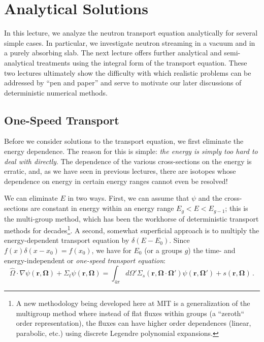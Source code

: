 \chapter{Analytical Solutions}
\label{lec:analytical}

In this lecture, we analyze the neutron transport equation analytically for several simple cases.  In particular, we investigate neutron streaming in a vacuum and in a purely absorbing slab.  The next lecture offers further analytical and semi-analytical treatments using the integral form of the transport equation.  These two lectures ultimately show the difficulty with which realistic problems can be addressed by ``pen and paper'' and serve to motivate our later discussions of deterministic numerical methods.

\section*{One-Speed Transport}

Before we consider solutions to the transport equation, we first eliminate the energy dependence.  The reason for this is simple: \textit{the energy is simply too hard to deal with directly}.  The dependence of the various cross-sections on the energy is erratic, and, as we have seen in previous lectures, there are isotopes whose dependence on energy in certain energy ranges cannot even be resolved!

We can eliminate $E$ in two ways.  First, we can assume that $\psi$ and the cross-sections are constant in energy within an energy range $E_g < E < E_{g-1}$; this is the multi-group method, which has been the workhorse of deterministic transport methods for decades\footnote{A new methodology being developed here at MIT is a generalization of the multigroup method where instead of flat fluxes within groups (a ``zeroth`` order representation), the fluxes can have higher order dependences (linear, parabolic, etc.) using discrete Legendre polynomial expansions.}.  A second, somewhat superficial approach is to multiply the energy-dependent transport equation by $\delta(E-E_0)$.   Since $f(x)\delta(x-x_0) = f(x_0)$, we have for $E_0$ (or a groups $g$) the time- and energy-independent or \textit{one-speed transport equation}:
\begin{equation}
     \hat{\Omega} \cdot \nabla \psi(\mathbf{r},\mathbf{\Omega})  + \Sigma_t \psi(\mathbf{r},\mathbf{\Omega}) =   \int_{4\pi} d\Omega' \Sigma_s(\mathbf{r},\mathbf{\Omega}\cdot\mathbf{\Omega}')\psi(\mathbf{r},\mathbf{\Omega'}) + s(\mathbf{r},\mathbf{\Omega})  \, .
\end{equation}

